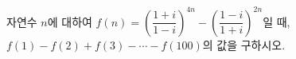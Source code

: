 자연수 $n$에 대하여 $f(n)=\left(\dfrac{1+i}{1-i}\right)^{4n}-\left(\dfrac{1-i}{1+i}\right)^{2n}$일 때, $f(1)-f(2)+f(3)-\cdots-f(100)$의 값을 구하시오.
